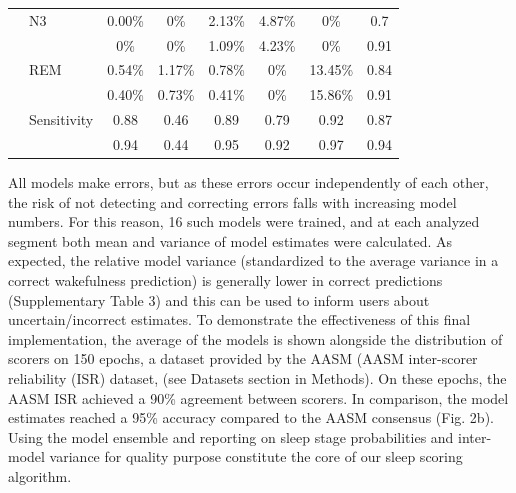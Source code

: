 \begin{table}[]
\begin{tabular}{@{}llcccccc@{}}
                                           & N3     & 0.00\%  & 0\%    & 2.13\%  & 4.87\% & 0\%     & 0.7                  \\
                                           &        & 0\%     & 0\%    & 1.09\%  & 4.23\% & 0\%     & 0.91                 \\
                                           & REM    & 0.54\%  & 1.17\% & 0.78\%  & 0\%    & 13.45\% & 0.84                 \\
                                           &        & 0.40\%  & 0.73\% & 0.41\%  & 0\%    & 15.86\% & 0.91                 \\
                                           & Sensitivity       & 0.88    & 0.46   & 0.89    & 0.79   & 0.92    & 0.87                 \\
                                           &        & 0.94    & 0.44   & 0.95    & 0.92   & 0.97    & 0.94                 \\ \bottomrule
    \end{tabular}
\end{table}
All models make errors, but as these errors occur independently of each other, the risk of not detecting and correcting errors falls with increasing model numbers.
For this reason, 16 such models were trained, and at each analyzed segment both mean and variance of model estimates were calculated. 
As expected, the relative model variance (standardized to the average variance in a correct wakefulness prediction) is generally lower in correct predictions (Supplementary Table 3) and this can be used to inform users about uncertain/incorrect estimates. 
To demonstrate the effectiveness of this final implementation, the average of the models is shown alongside the distribution of  scorers on 150 epochs, a dataset provided by the AASM (AASM inter-scorer reliability (ISR) dataset, (see Datasets section in Methods). 
On these epochs, the AASM ISR achieved a 90\% agreement between scorers. 
In comparison, the model estimates reached a 95\% accuracy compared to the AASM consensus (Fig. 2b). 
Using the model ensemble and reporting on sleep stage probabilities and inter-model variance for quality purpose constitute the core of our sleep scoring algorithm.
